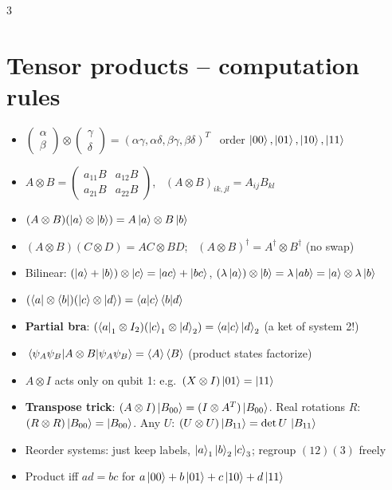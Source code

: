 \documentclass[10pt]{article}
\newcommand{\B}[1]{\ket{B_{#1}}}
\newcommand{\trap}{\textcolor{red!70!black}}   %
\begin{document}
\begin{multicols*}{3}
\section{Tensor products -- computation rules}
\begin{itemize}
  \item $\begin{pmatrix}\alpha\\\beta\end{pmatrix}\!\otimes\!\begin{pmatrix}\gamma\\\delta\end{pmatrix}=(\alpha\gamma,\alpha\delta,\beta\gamma,\beta\delta)^T$ \ order $\ket{00},\ket{01},\ket{10},\ket{11}$
  \item $A\otimes B=\begin{pmatrix}a_{11}B & a_{12}B\\ a_{21}B & a_{22}B\end{pmatrix}$, \ $(A\otimes B)_{ik,jl}=A_{ij}B_{kl}$
  \item $(A\otimes B)(\ket a\otimes\ket b)=A\ket a\otimes B\ket b$
  \item $(A\otimes B)(C\otimes D)=AC\otimes BD$; \ $(A\otimes B)^\dagger=A^\dagger\otimes B^\dagger$ (\trap{no swap})
  \item Bilinear: $(\ket a+\ket b)\otimes\ket c=\ket{ac}+\ket{bc}$, $(\lambda\ket a)\otimes\ket b=\lambda\ket{ab}=\ket a\otimes\lambda\ket b$
  \item $(\bra a\otimes\bra b)(\ket c\otimes\ket d)=\braket{a}{c}\braket{b}{d}$
  \item \textbf{Partial bra}: $(\bra a_1\otimes I_2)(\ket c_1\otimes\ket d_2)=\braket{a}{c}\ket{d}_2$ (a ket of system 2!)
  \item $\mel{\psi_A\psi_B}{A\otimes B}{\psi_A\psi_B}=\ev{A}\ev{B}$ (product states factorize)
  \item $A\otimes I$ acts only on qubit 1: e.g.\ $(X\otimes I)\ket{01}=\ket{11}$
  \item \textbf{Transpose trick}: $(A\otimes I)\B{00}=(I\otimes A^T)\B{00}$. Real rotations $R$: $(R\otimes R)\B{00}=\B{00}$. Any $U$: $(U\otimes U)\B{11}=\det U\,\B{11}$
  \item Reorder systems: just keep labels, $\ket{a}_1\ket{b}_2\ket{c}_3$; regroup $(12)(3)$ freely
  \item Product iff $a d=bc$ for $a\ket{00}+b\ket{01}+c\ket{10}+d\ket{11}$
\end{itemize}


\end{multicols*}
\end{document}
